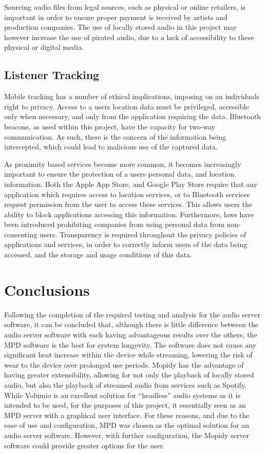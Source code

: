 \documentclass[11pt,a4paper,headinclude=false,footinclude=false]{scrreprt}
\begin{document}
Sourcing audio files from legal sources, such as physical or online
retailers, is important in order to ensure proper payment is received by
artists and production companies. The use of locally stored audio in
this project may however increase the use of pirated audio, due to a
lack of accessibility to these physical or digital media.

\section{Listener Tracking}\label{listener-tracking-3}

Mobile tracking has a number of ethical implications, imposing on an
individuals right to privacy. Access to a users location data must be
privileged, accessible only when necessary, and only from the
application requiring the data. Bluetooth beacons, as used within this
project, have the capacity for two-way communication. As such, there is
the concern of the information being intercepted, which could lead to
malicious use of the captured data\cite{bleprivacy}.

As proximity based services become more common, it becomes increasingly
important to ensure the protection of a users personal data, and
location information. Both the Apple App Store, and Google Play Store
require that any application which requires access to location services,
or to Bluetooth services request permission from the user to access
these services. This allows users the ability to block applications
accessing this information. Furthermore, laws have been introduced
prohibiting companies from using personal data from non-consenting
users\cite{proxmarketing}. Transparency is required throughout the
privacy policies of applications and services, in order to correctly
inform users of the data being accessed, and the storage and usage
conditions of this data.

\chapter{Conclusions}\label{conclusions}

Following the completion of the required testing and analysis for the
audio server software, it can be concluded that, although there is
little difference between the audio server software with each having
advantageous results over the others, the MPD software is the best for
system longevity. The software does not cause any significant heat
increase within the device while streaming, lowering the risk of wear to
the device over prolonged use periods. Mopidy has the advantage of
having greater extensibility, allowing for not only the playback of
locally stored audio, but also the playback of streamed audio from
services such as Spotify. While Volumio is an excellent solution for
``headless'' audio systems as it is intended to be used, for the
purposes of this project, it essentially seen as an MPD server with a
graphical user interface. For these reasons, and due to the ease of use
and configuration, MPD was chosen as the optimal solution for an audio
server software. However, with further configuration, the Mopidy server
software could provide greater options for the user.
\end{document}
